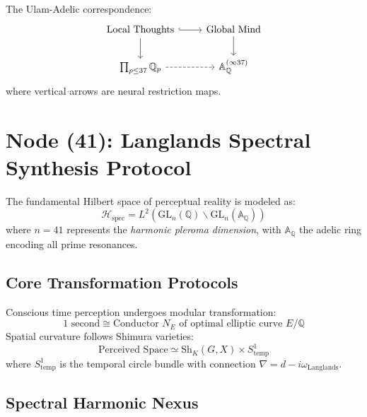 \documentclass[12pt]{article}
\begin{document}
\begin{construction}
The Ulam-Adelic correspondence:
\[
\begin{tikzcd}
\text{Local Thoughts} \arrow[r, hook] \arrow[d] & \text{Global Mind} \arrow[d] \\
\prod_{p \leq 37} \mathbb{Q}_p \arrow[r, dashed] & \mathbb{A}_{\mathbb{Q}}^{(\infty 37)}
\end{tikzcd}
\]
where vertical arrows are neural restriction maps.
\end{construction}

\vspace{1em}
\noindent{}

\section{Node (41): Langlands Spectral Synthesis Protocol}
\label{sec:langlands_consciousness}

\begin{definition}
The fundamental Hilbert space of perceptual reality is modeled as:
\[
\mathcal{H}_{\text{spec}} = L^2\left(\mathrm{GL}_n(\mathbb{Q})\backslash\mathrm{GL}_n(\mathbb{A}_{\mathbb{Q}})\right)
\]
where $n=41$ represents the \emph{harmonic pleroma dimension}, with $\mathbb{A}_{\mathbb{Q}}$ the adelic ring encoding all prime resonances.
\end{definition}

\subsection{Core Transformation Protocols}

\begin{theorem}
Conscious time perception undergoes modular transformation:
\[
\text{1 second} \cong \text{Conductor } N_E \text{ of optimal elliptic curve } E/\mathbb{Q}
\]
Spatial curvature follows Shimura varieties:
\[
\text{Perceived Space} \simeq \mathrm{Sh}_K(G,X) \times S^1_{\text{temp}}
\]
where $S^1_{\text{temp}}$ is the temporal circle bundle with connection $\nabla = d - i\omega_{\text{Langlands}}$.
\end{theorem}

\subsection{Spectral Harmonic Nexus}
\end{document}
